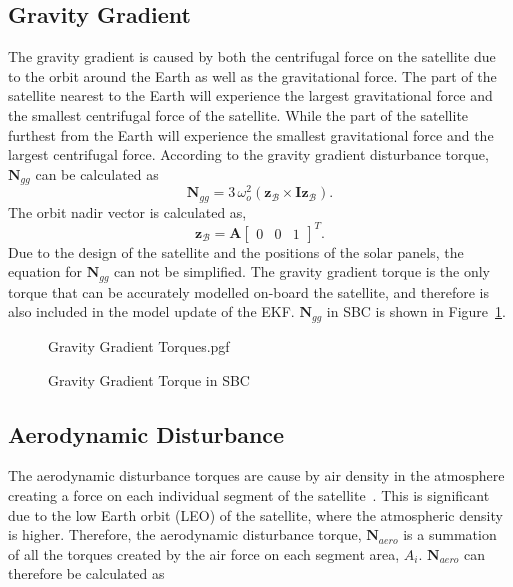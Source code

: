 \subsection{Gravity Gradient}
The gravity gradient is caused by both the centrifugal force on the satellite due to the orbit around the Earth as well as the gravitational force. The part of the satellite nearest to the Earth will experience the largest gravitational force and the smallest centrifugal force of the satellite. While the part of the satellite furthest from the Earth will experience the smallest gravitational force and the largest centrifugal force. According to \cite{wertz2012spacecraft} the gravity gradient disturbance torque, $\mathbf{N}_{gg}$ can be calculated as 
\begin{equation}
\boldsymbol{N}_{gg} = 3 \, \omega_o^2 (\mathbf{z}_{\mathcal{B}} \times \mathbf{Iz}_{\mathcal{B}}).
\end{equation}
The orbit nadir vector is calculated as,
\begin{equation}
\mathbf{z}_{\mathcal{B}} = \boldsymbol{A} \begin{bmatrix} 0 & 0 & 1 \end{bmatrix}^T.
\end{equation}
Due to the design of the satellite and the positions of the solar panels, the equation for $\mathbf{N}_{gg}$ can not be simplified. The gravity gradient torque is the only torque that can be accurately modelled on-board the satellite, and therefore is also included in the model update of the EKF. $\mathbf{N}_{gg}$ in SBC is shown in Figure~\ref{fig:GravityGradientTorques}.

\begin{figure}[!htb]
	\centering
	\def\pgfwidth{10cm}
	{Gravity Gradient Torques.pgf}
	
	\caption{Gravity Gradient Torque in SBC}
	\label{fig:GravityGradientTorques}
\end{figure}

\subsection{Aerodynamic Disturbance}
The aerodynamic disturbance torques are cause by air density in the atmosphere creating a force on each individual segment of the satellite~\cite{Steyn2014}. This is significant due to the low Earth orbit (LEO) of the satellite, where the atmospheric density is higher. Therefore, the aerodynamic disturbance torque, $\mathbf{N}_{aero}$ is a summation of all the torques created by the air force on each segment area, $A_i$. $\mathbf{N}_{aero}$ can therefore be calculated as


